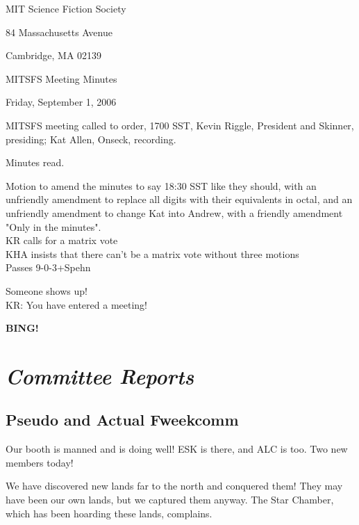 \documentclass[10pt]{article}
\newcommand{\bing}{{\bf BING!} }
\newcommand{\goto}[1]{\bing \vskip 12pt \section*{{\em{#1}}}}
\begin{document}
\begin{center}

MIT Science Fiction Society

84 Massachusetts Avenue

Cambridge, MA 02139

\vspace{12pt}

MITSFS Meeting Minutes

Friday, September 1, 2006

\end{center}

\vspace{18pt}

\setlength{\parskip}{6pt}

\noindent
MITSFS meeting called to order, 1700 SST,
Kevin Riggle, President and Skinner, presiding; Kat Allen, Onseck, recording.

Minutes read.

Motion to amend the minutes to say 18:30 SST like they should, with an
unfriendly amendment to replace all digits with their equivalents in
octal, and an unfriendly amendment to change Kat into Andrew, with a
friendly amendment "Only in the minutes".\\
KR calls for a matrix vote\\
KHA insists that there can't be a matrix vote without three motions\\
Passes 9-0-3+Spehn

Someone shows up!\\
KR: You have entered a meeting!
 
\goto{Committee Reports}


\subsection*{Pseudo and Actual Fweekcomm}
Our booth is manned and is doing well! ESK is there, and ALC is too.
Two new members today!

We have discovered new lands far to the north and conquered them!
They may have been our own lands, but we captured them anyway.
The Star Chamber, which has been hoarding these lands, complains.

\end{document}
